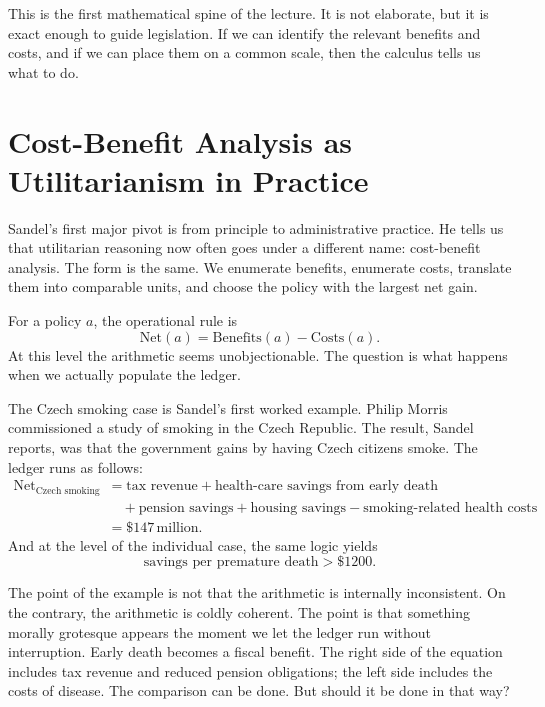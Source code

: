 This is the first mathematical spine of the lecture. It is not elaborate, but it is exact enough to guide legislation. If we can identify the relevant benefits and costs, and if we can place them on a common scale, then the calculus tells us what to do.

\section{Cost-Benefit Analysis as Utilitarianism in Practice}

Sandel's first major pivot is from principle to administrative practice. He tells us that utilitarian reasoning now often goes under a different name: cost-benefit analysis. The form is the same. We enumerate benefits, enumerate costs, translate them into comparable units, and choose the policy with the largest net gain.

For a policy \(a\), the operational rule is
\begin{equation}
\text{Net}(a)=\text{Benefits}(a)-\text{Costs}(a).
\end{equation}
At this level the arithmetic seems unobjectionable. The question is what happens when we actually populate the ledger.

The Czech smoking case is Sandel's first worked example. Philip Morris commissioned a study of smoking in the Czech Republic. The result, Sandel reports, was that the government gains by having Czech citizens smoke. The ledger runs as follows:
\begin{align}
\text{Net}_{\text{Czech smoking}}
&=\text{tax revenue}
+\text{health-care savings from early death} \nonumber\\
&\quad+\text{pension savings}
+\text{housing savings}
-\text{smoking-related health costs} \nonumber\\
&=\$147\,\text{million}.
\end{align}
And at the level of the individual case, the same logic yields
\begin{equation}
\text{savings per premature death} > \$1200.
\end{equation}

The point of the example is not that the arithmetic is internally inconsistent. On the contrary, the arithmetic is coldly coherent. The point is that something morally grotesque appears the moment we let the ledger run without interruption. Early death becomes a fiscal benefit. The right side of the equation includes tax revenue and reduced pension obligations; the left side includes the costs of disease. The comparison can be done. But should it be done in that way?

